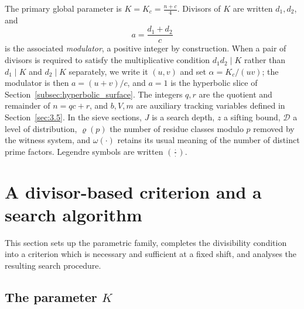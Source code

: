 \documentclass[11pt, a4paper]{article}
\theoremstyle{plain}
\theoremstyle{definition}
\newcommand{\leg}[2]{\left(\frac{#1}{#2}\right)}
\begin{document}
The primary global parameter is $K=K_c=\frac{n+c}{4}$. Divisors of $K$ are written $d_1,d_2$, and
$$a=\frac{d_1+d_2}{c}$$
is the associated \emph{modulator}, a positive integer by construction. When a pair of divisors is required to satisfy the multiplicative condition $d_1d_2\mid K$ rather than $d_1\mid K$ and $d_2\mid K$ separately, we write it $(u,v)$ and set $\alpha=K_c/(uv)$; the modulator is then $a=(u+v)/c$, and $a=1$ is the hyperbolic slice of Section~\ref{subsec:hyperbolic_surface}. The integers $q,r$ are the quotient and remainder of $n=qc+r$, and $b,V,m$ are auxiliary tracking variables defined in Section~\ref{sec:3.5}. In the sieve sections, $J$ is a search depth, $z$ a sifting bound, $\mathcal{D}$ a level of distribution, $\varrho(p)$ the number of residue classes modulo $p$ removed by the witness system, and $\omega(\cdot)$ retains its usual meaning of the number of distinct prime factors. Legendre symbols are written $\leg{\cdot}{\cdot}$.

\section{A divisor-based criterion and a search algorithm}\label{sec:3}

This section sets up the parametric family, completes the divisibility condition into a criterion which is necessary and sufficient at a fixed shift, and analyses the resulting search procedure.

\subsection{The parameter $K$}\label{sec:3.1}
\end{document}
